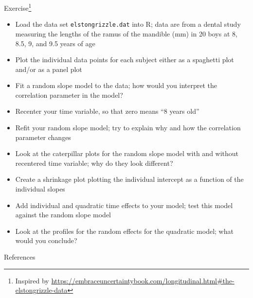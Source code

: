 \documentclass[aspectratio=169]{beamer}
\begin{document}
\begin{frame}[fragile]{}
    \footnotesize
  \begin{block}{Exercise\footnote{Inspired by
    \url{https://embraceuncertaintybook.com/longitudinal.html\#the-elstongrizzle-data}}}
    \begin{itemize}
      \item Load the data set \texttt{elstongrizzle.dat} into R; data are from a
        dental study measuring the lengths of the ramus of the mandible (mm) in
        20 boys at 8, 8.5, 9, and 9.5 years of age
      \item Plot the individual data points for each subject either as a
        spaghetti plot and/or as a panel plot
      \item Fit a random slope model to the data; how would you interpret the
        correlation parameter in the model?
      \item Recenter your time variable, so that zero means ``8 years old''
      \item Refit your random slope model; try to explain why and how the
        correlation parameter changes
      \item Look at the caterpillar plots for the random slope model with and
        without recentered time variable; why do they look different?
      \item Create a shrinkage plot plotting the individual intercept as a
        function of the individual slopes
      \item Add individual and quadratic time effects to your model; test this
        model against the random slope model
      \item Look at the profiles for the random effects for the quadratic model;
        what would you conclude?
    \end{itemize}
  \end{block}
\end{frame}

\appendix

\begin{frame}{References}
  \printbibliography
  \vfill
\end{frame}
 
\end{document}
